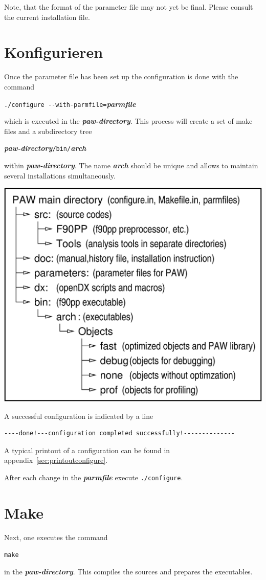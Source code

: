 \documentclass[a4paper,10pt]{report}
\newcommand{\myspec}[1]{\textbf{\textit{#1}}}
\newcommand{\mytt}[1]{{\tt #1}}
\begin{document}
Note, that the format of the parameter file may not yet be final. Please
consult the current installation file.

\section{Konfigurieren}
Once the parameter file has been set up the configuration is done with the command
\begin{center}
\verb+./configure --with-parmfile=+\myspec{parmfile}
\end{center}
which is executed in the \myspec{paw-directory}. This process will
create a set of make files and a subdirectory tree 
\begin{center}
\myspec{paw-directory}\mytt{/bin/}\myspec{arch}
\end{center}
within \myspec{paw-directory}.  The name \myspec{arch} should be
unique and allows to maintain several installations simultaneously.

\begin{center}
\includegraphics[width=0.6\linewidth]{Figs/PAWdirtree/pawdirtree.eps}
\end{center}

A successful configuration is indicated by a line
\begin{verbatim}
----done!---configuration completed successfully!--------------
\end{verbatim}
A typical printout of a configuration can be found in
appendix~\ref{sec:printoutconfigure}.


After each change in the \myspec{parmfile} execute \verb+./configure+.

\section{Make}
Next, one executes the command
\begin{center}
\mytt{make}
\end{center}
in the \myspec{paw-directory}. This compiles the sources and prepares
the executables.
\end{document}
